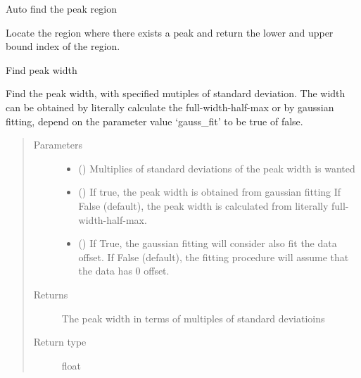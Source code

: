 \documentclass[letterpaper,10pt,english]{sphinxmanual}
\begin{document}
\begin{fulllineitems}

\begin{fulllineitems}
\label{\detokenize{scibeam.core:scibeam.core.peak.SeriesPeak.region}}
Auto find the peak region

Locate the region where there exists a peak and return
the lower and upper bound index of the region.

\end{fulllineitems}


\begin{fulllineitems}
\label{\detokenize{scibeam.core:scibeam.core.peak.SeriesPeak.sigma}}
Find peak width

Find the peak width, with specified mutiples of standard deviation.
The width can be obtained by literally calculate the full-width-half-max
or by gaussian fitting, depend on the parameter value ‘gauss\_fit’ to be
true of false.
\begin{quote}\begin{description}
\item[{Parameters}] \leavevmode\begin{itemize}
\item {} 
 () \textendash{} Multiplies of standard deviations of the peak width is wanted

\item {} 
 () \textendash{} If true, the peak width is obtained from gaussian fitting
If False (default), the peak width is calculated from literally
full-width-half-max.

\item {} 
 () \textendash{} If True, the gaussian fitting will consider also fit the data
offset. If False (default), the fitting procedure will assume that
the data has 0 offset.

\end{itemize}

\item[{Returns}] \leavevmode
The peak width in terms of multiples of standard deviatioins

\item[{Return type}] \leavevmode
float

\end{description}\end{quote}

\end{fulllineitems}


\end{fulllineitems}
\end{document}
